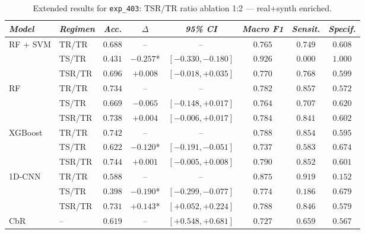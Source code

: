 \begin{table}[H]
\centering
\scriptsize
\caption{Extended results for \texttt{exp\_403}: TSR/TR ratio ablation 1:2 — real+synth enriched.}
\label{tab:appendix_exp_403}
\begin{tabular*}{\textwidth}{@{\extracolsep{\fill}}llcccccc}
\toprule
\emph{Model} & \emph{Regimen} & \emph{Acc.} & \emph{$\Delta$} & \emph{95\% CI} & \emph{Macro F1} & \emph{Sensit.} & \emph{Specif.}\\
\midrule
\multirow{3}{*}{RF + SVM} & TR/TR & $0.688$ & -- & -- & $0.765$ & $0.749$ & $0.608$\\
 & TS/TR & $0.431$ & $-0.257$* & $[-0.330, -0.180]$ & $0.926$ & $0.000$ & $1.000$\\
 & TSR/TR & $0.696$ & $+0.008$ & $[-0.018, +0.035]$ & $0.770$ & $0.768$ & $0.599$\\
\midrule
\multirow{3}{*}{RF} & TR/TR & $0.734$ & -- & -- & $0.782$ & $0.857$ & $0.572$\\
 & TS/TR & $0.669$ & $-0.065$ & $[-0.148, +0.017]$ & $0.764$ & $0.707$ & $0.620$\\
 & TSR/TR & $0.738$ & $+0.004$ & $[-0.006, +0.017]$ & $0.784$ & $0.841$ & $0.602$\\
\midrule
\multirow{3}{*}{XGBoost} & TR/TR & $0.742$ & -- & -- & $0.788$ & $0.854$ & $0.595$\\
 & TS/TR & $0.622$ & $-0.120$* & $[-0.191, -0.051]$ & $0.737$ & $0.583$ & $0.674$\\
 & TSR/TR & $0.744$ & $+0.001$ & $[-0.005, +0.008]$ & $0.790$ & $0.852$ & $0.601$\\
\midrule
\multirow{3}{*}{1D-CNN} & TR/TR & $0.588$ & -- & -- & $0.875$ & $0.919$ & $0.152$\\
 & TS/TR & $0.398$ & $-0.190$* & $[-0.299, -0.077]$ & $0.774$ & $0.186$ & $0.679$\\
 & TSR/TR & $0.731$ & $+0.143$* & $[+0.052, +0.224]$ & $0.788$ & $0.846$ & $0.579$\\
\midrule
CbR & -- & $0.619$ & -- & $[+0.548, +0.681]$ & $0.727$ & $0.659$ & $0.567$\\
\bottomrule
\end{tabular*}
\end{table}

